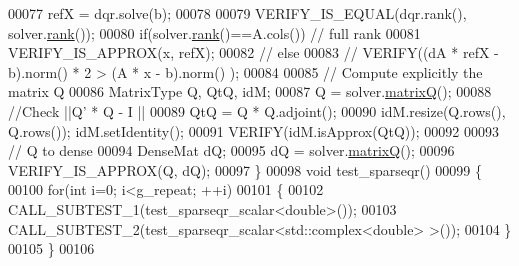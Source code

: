 \begin{DoxyCode}
00077   refX = dqr.solve(b);
00078   
00079   VERIFY\_IS\_EQUAL(dqr.rank(), solver.\hyperlink{group___sparse_q_r___module_a70ec2b9e5cb62a41dc1ee2adfb54e9b0}{rank}());
00080   \textcolor{keywordflow}{if}(solver.\hyperlink{group___sparse_q_r___module_a70ec2b9e5cb62a41dc1ee2adfb54e9b0}{rank}()==A.cols()) \textcolor{comment}{// full rank}
00081     VERIFY\_IS\_APPROX(x, refX);
00082 \textcolor{comment}{//   else}
00083 \textcolor{comment}{//     VERIFY((dA * refX - b).norm() * 2 > (A * x - b).norm() );}
00084 
00085   \textcolor{comment}{// Compute explicitly the matrix Q}
00086   MatrixType Q, QtQ, idM;
00087   Q = solver.\hyperlink{group___sparse_q_r___module_ae1cc0a836c177d4f42600f8639354be1}{matrixQ}();
00088   \textcolor{comment}{//Check  ||Q' * Q - I ||}
00089   QtQ = Q * Q.adjoint();
00090   idM.resize(Q.rows(), Q.rows()); idM.setIdentity();
00091   VERIFY(idM.isApprox(QtQ));
00092   
00093   \textcolor{comment}{// Q to dense}
00094   DenseMat dQ;
00095   dQ = solver.\hyperlink{group___sparse_q_r___module_ae1cc0a836c177d4f42600f8639354be1}{matrixQ}();
00096   VERIFY\_IS\_APPROX(Q, dQ);
00097 \}
00098 \textcolor{keywordtype}{void} test\_sparseqr()
00099 \{
00100   \textcolor{keywordflow}{for}(\textcolor{keywordtype}{int} i=0; i<g\_repeat; ++i)
00101   \{
00102     CALL\_SUBTEST\_1(test\_sparseqr\_scalar<double>());
00103     CALL\_SUBTEST\_2(test\_sparseqr\_scalar<std::complex<double> >());
00104   \}
00105 \}
00106 
\end{DoxyCode}

